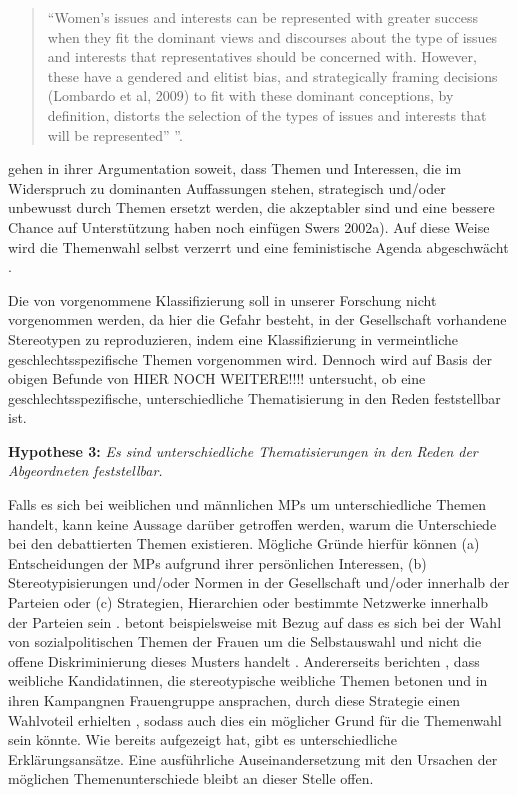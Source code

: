 \documentclass[12pt, 
    twoside=false, 
    bibliography=totoc, 
    numbers=endperiod, 
    headings=normal, 
    toc=chapterentrydotfill
    ]{scrbook}
\begin{document}
\begin{quote}
    \enquote{Women’s issues and interests can be represented with greater success when they fit the dominant views and discourses about the type of issues and interests that representatives should be concerned with. However, these have a gendered and elitist bias, and strategically framing decisions (Lombardo et al, 2009) to fit with these dominant conceptions, by definition, distorts the selection of the types of issues and interests that will be represented” \parencite[151]{celis_2018}}.
\end{quote}

\textcite{celis_2018} gehen in ihrer Argumentation soweit, dass Themen und Interessen, die im Widerspruch zu dominanten Auffassungen stehen, strategisch und/oder unbewusst durch Themen ersetzt werden, die akzeptabler sind und eine bessere Chance auf Unterstützung haben \parencites[151]{celis_2018}{swers_2002a} noch einfügen Swers 2002a). Auf diese Weise wird die Themenwahl selbst verzerrt und eine feministische Agenda abgeschwächt \parencite[151]{celis_2018}. 

Die von \textcite{back_2014} vorgenommene Klassifizierung soll in unserer Forschung nicht vorgenommen werden, da hier die Gefahr besteht, in der Gesellschaft vorhandene Stereotypen zu reproduzieren, indem eine Klassifizierung in vermeintliche geschlechtsspezifische Themen vorgenommen wird. Dennoch wird auf Basis der obigen Befunde von \textcites{wangnerud_2000}{wangnerud_2009}{back_2014} HIER NOCH WEITERE!!!! untersucht, ob eine geschlechtsspezifische, unterschiedliche Thematisierung in den Reden feststellbar ist. 

\textbf{Hypothese 3:} \emph{Es sind unterschiedliche Thematisierungen in den Reden der Abgeordneten feststellbar.}


Falls es sich bei weiblichen und männlichen MPs um unterschiedliche Themen handelt, kann keine Aussage darüber getroffen werden, warum die Unterschiede bei den debattierten Themen existieren. Mögliche Gründe hierfür können (a) Entscheidungen der MPs aufgrund ihrer persönlichen Interessen, (b) Stereotypisierungen und/oder Normen in der Gesellschaft und/oder innerhalb der Parteien oder (c) Strategien, Hierarchien oder bestimmte Netzwerke innerhalb der Parteien sein \parencites[507]{back_2014}.
\textcite [250]{ennser-jedenastik_2017} betont beispielsweise mit Bezug auf \textcites{backgaard_2012}{thomas_1994} dass es sich bei der Wahl von sozialpolitischen Themen der Frauen um die Selbstauswahl und nicht die offene Diskriminierung dieses Musters handelt \parencite[250]{ennser-jedenastik_2017}. Andererseits berichten \textcite{herrnson_2003}, dass weibliche Kandidatinnen, die stereotypische weibliche Themen betonen und in ihren Kampangnen Frauengruppe ansprachen, durch diese Strategie einen Wahlvoteil erhielten \parencite[250]{ennser-jedenastik_2017}, sodass auch dies ein möglicher Grund für die Themenwahl sein könnte. Wie \textcite{back_2014} bereits aufgezeigt hat, gibt es unterschiedliche Erklärungsansätze. Eine ausführliche Auseinandersetzung mit den Ursachen der möglichen Themenunterschiede bleibt an dieser Stelle offen.
\end{document}
